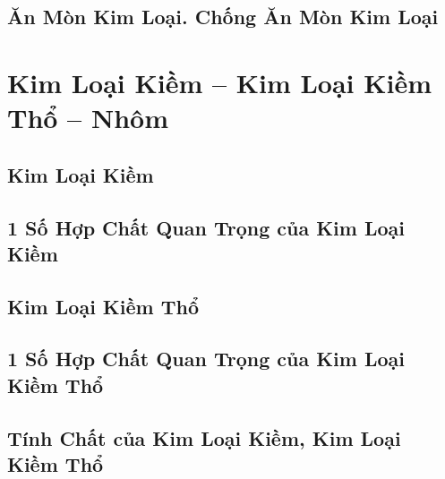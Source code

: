 \documentclass{article}
\numberwithin{equation}{section}
\begin{document}

\subsection{Ăn Mòn Kim Loại. Chống Ăn Mòn Kim Loại}


\section{Kim Loại Kiềm -- Kim Loại Kiềm Thổ -- Nhôm}

\subsection{Kim Loại Kiềm}


\subsection{1 Số Hợp Chất Quan Trọng của Kim Loại Kiềm}


\subsection{Kim Loại Kiềm Thổ}


\subsection{1 Số Hợp Chất Quan Trọng của Kim Loại Kiềm Thổ}


\subsection{Tính Chất của Kim Loại Kiềm, Kim Loại Kiềm Thổ}

\end{document}
